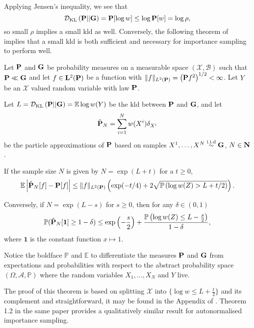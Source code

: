 Applying Jensen's inequality, we see that
$$
\Dkl{\P}{\G} = \P [\log w] \leq \log \P[w] = \log\rho,
$$
so small $\rho$ implies a small \acrshort{kld} as well. Conversely, the following theorem of \citeauthor{Chatterjee2018Sample} implies that a small \acrshort{kld} is both sufficient and necessary for importance sampling to perform well.
\begin{theorem}
    \label{thm:chatterje2018Thm1}
     Let $\P$ and $\G$ be probability measures on a measurable space $(\mathcal X, \mathcal B)$ such that $\P \ll \G$ and let $f \in \mathbf L^2(\P)$ be a function with $\lVert f \rVert_{L^{2}(\P)} = \left( \P f^{2} \right)^{1 / 2} < 
     \infty$. Let $Y$ be an $\mathcal X$ valued random variable with law $\P$. 
     
     Let $L = \Dkl{\P}{\G} = \mathbb E \log w(Y)$ be the \acrshort{kld} between $\P$ and $\G$, and let $$\hat \P_N = \sum_{i = 1}^N w(X^i) \delta_{X^i}$$ be the particle approximations of $\P$  based on samples $X^1, \dots, X^N\iid \G$, $N \in \N$. 
     
     If the sample size $N$ is given by $N = \exp\left( L + t \right)$ for a $t \geq 0$,
     \begin{align} \label{eq:chatterje-upper-bound}\mathbb E \left\lvert \hat \P_N[f] - \P [f] \right\rvert \leq \lVert f \rVert_{L^2(\P)} \left(\exp(-t / 4) + 2 \sqrt{\mathbb P \left( \log w(Z) > L + t / 2 \right)}\right). \end{align}

    Conversely, if $N = \exp \left( L - s \right)$ for $s \geq 0$, then for any $\delta \in (0,1)$ 
    \begin{align}
        \label{eq:chatterje-lower-bound}
    \mathbb P (\hat \P_{N}[ \mathbf 1 ] \geq 1 - \delta) \leq \exp \left( -\frac{s}{2} \right) + \frac{\mathbb P \left( \log w(Z) \leq L -\frac{s}{2} \right)}{ 1- \delta},
    \end{align}
    where $\mathbf 1$ is the constant function $x \mapsto 1$.

     Notice the boldface $\mathbb P$ and $\mathbb E$ to differentiate the measures $\P$ and $\G$ from expectations and probabilities with respect to the abstract probability space $\left( \Omega, \mathcal A, \mathbb P \right)$ where the random variables $X_{1}, \dots, X_{N}$ and $Y$ live.
\end{theorem}

The proof of this theorem is based on splitting $\mathcal X$ into $\{\log w \leq L + \frac{t}{2}\} $ and its complement and straightforward, it may be found in the Appendix of \citep{Chatterjee2018Sample}. Theorem 1.2 in the same paper provides a qualitatively similar result for autonormalised importance sampling.

